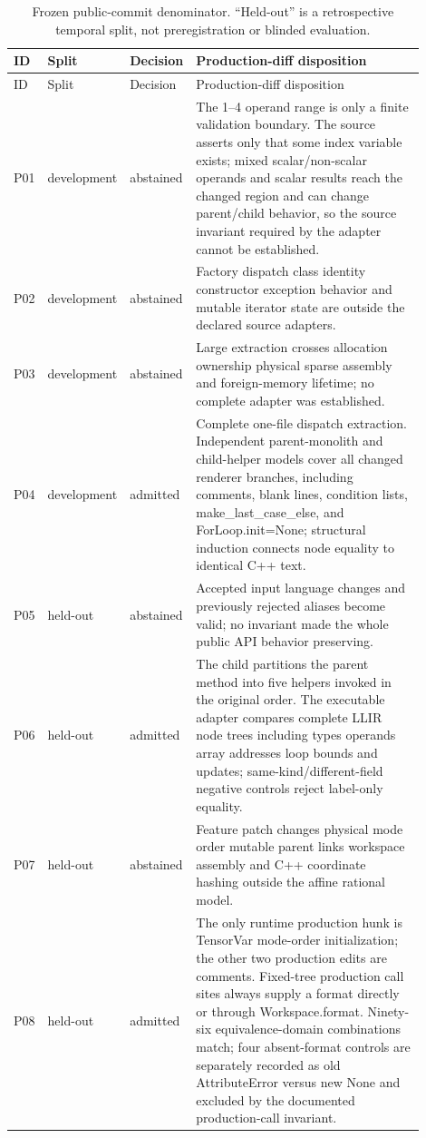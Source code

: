 \begin{longtable}{@{}p{0.055\linewidth}p{0.13\linewidth}p{0.13\linewidth}p{0.585\linewidth}@{}}
\caption{Frozen public-commit denominator. ``Held-out'' is a retrospective temporal split, not preregistration or blinded evaluation.}\label{tab:public-corpus}\\
\toprule ID & Split & Decision & Production-diff disposition\\\midrule\endfirsthead
\toprule ID & Split & Decision & Production-diff disposition\\\midrule\endhead
\bottomrule\endfoot
P01 & development & abstained & The 1--4 operand range is only a finite validation boundary. The source asserts only that some index variable exists; mixed scalar/non-scalar operands and scalar results reach the changed region and can change parent/child behavior, so the source invariant required by the adapter cannot be established.\\
P02 & development & abstained & Factory dispatch class identity constructor exception behavior and mutable iterator state are outside the declared source adapters.\\
P03 & development & abstained & Large extraction crosses allocation ownership physical sparse assembly and foreign-memory lifetime; no complete adapter was established.\\
P04 & development & admitted & Complete one-file dispatch extraction. Independent parent-monolith and child-helper models cover all changed renderer branches, including comments, blank lines, condition lists, make\_last\_case\_else, and ForLoop.init=None; structural induction connects node equality to identical C++ text.\\
P05 & held-out & abstained & Accepted input language changes and previously rejected aliases become valid; no invariant made the whole public API behavior preserving.\\
P06 & held-out & admitted & The child partitions the parent method into five helpers invoked in the original order. The executable adapter compares complete LLIR node trees including types operands array addresses loop bounds and updates; same-kind/different-field negative controls reject label-only equality.\\
P07 & held-out & abstained & Feature patch changes physical mode order mutable parent links workspace assembly and C++ coordinate hashing outside the affine rational model.\\
P08 & held-out & admitted & The only runtime production hunk is TensorVar mode-order initialization; the other two production edits are comments. Fixed-tree production call sites always supply a format directly or through Workspace.format. Ninety-six equivalence-domain combinations match; four absent-format controls are separately recorded as old AttributeError versus new None and excluded by the documented production-call invariant.\\

\end{longtable}
